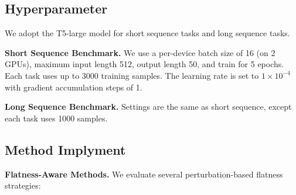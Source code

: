 \documentclass[letterpaper]{article} %
\begin{document}
\subsection{Hyperparameter}
We adopt the T5-large model for short sequence tasks and long sequence tasks.

\textbf{Short Sequence Benchmark.} We use a per-device batch size of 16 (on 2 GPUs), maximum input length 512, output length 50, and train for 5 epochs. Each task uses up to 3000 training samples. The learning rate is set to $1\times10^{-4}$ with gradient accumulation steps of 1.

\textbf{Long Sequence Benchmark.} Settings are the same as short sequence, except each task uses 1000 samples.






\subsection{Method Implyment}
\textbf{Flatness-Aware Methods.}  
We evaluate several perturbation-based flatness strategies:
\end{document}
